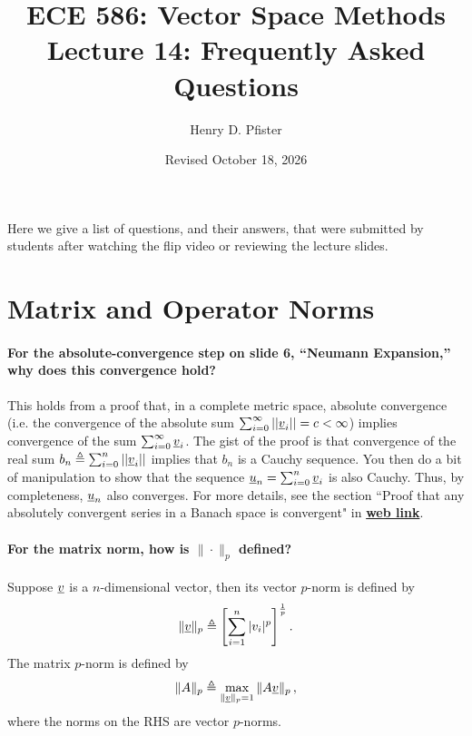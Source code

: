 \documentclass[10pt,english]{article}
\begin{document}
\title{ECE 586: Vector Space Methods \\ Lecture 14: Frequently Asked Questions}
\author{Henry D. Pfister \\ \univ}
\date{Revised October 18, 2026}

\maketitle

Here we give a list of questions, and their answers, that were submitted by students after watching the flip video or reviewing the lecture slides.

\section{Matrix and Operator Norms}

\paragraph{For the absolute-convergence step on slide 6, ``Neumann Expansion,'' why does this convergence hold?}
This holds from a proof that, in a complete metric space, absolute convergence (i.e. the convergence of the absolute sum $\sum_{i=0}^\infty ||\underline{v}_i|| = c <\infty $) implies convergence of the sum $ \sum_{i=0}^\infty \underline{v}_i$. The gist of the proof is that convergence of the real sum $b_n \triangleq \sum_{i=0}^n ||\underline{v}_i|| $ implies that $b_n$ is a Cauchy sequence. You then do a bit of manipulation to show that the sequence $\underline{u}_n = \sum_{i=0}^n \underline{v}_i$ is also Cauchy.
Thus, by completeness, $\underline{u}_n$ also converges.
For more details, see the section
``Proof that any absolutely convergent series in a Banach space is convergent" in
\href{https://en.wikipedia.org/wiki/Absolute_convergence}{\textbf{web link}}.

\paragraph{For the matrix norm, how is $\| \cdot \|_p$ defined?}
Suppose $\underline{v}$ is a $n$-dimensional vector, then its vector $p$-norm is defined by
$$\| \underline{v} \|_p \triangleq \left[\sum_{i=1}^n |v_i|^p \right]^{\frac1p}.$$
The matrix $p$-norm is defined by
$$\| A \|_p \triangleq \max_{\|\underline{v}\|_p = 1} \|A \underline{v} \|_p \, , $$
where the norms on the RHS are vector $p$-norms.
\end{document}
